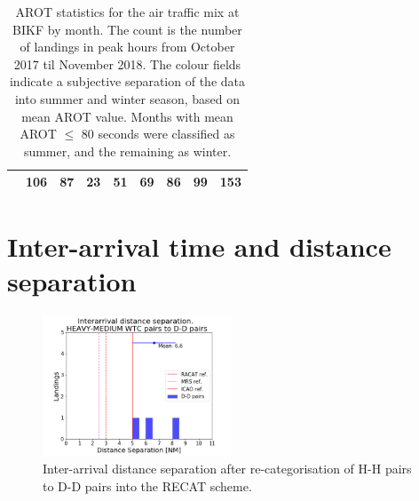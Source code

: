\begin{table}[h]
{\begin{tabular}{lr|r|r|r|r|r|r|r|}
\rowcolor[HTML]{DAE8FC} 
\multicolumn{1}{|l|}{\cellcolor[HTML]{DAE8FC}December} & 106 & 87 & 23 & 51 & 69 & 86 & 99 & 153 \\ \hline
\end{tabular}%
}
\caption[AROTs for the air traffic mix by month]{AROT statistics for the air traffic mix at BIKF by month. The count is the number of landings in peak hours from October 2017 til November 2018. The colour fields indicate a subjective separation of the data into summer and winter season, based on mean AROT value. Months with mean AROT $\leq$ 80 seconds were classified as summer, and the remaining as winter.}
\label{tab:month2season_arot}
\end{table}

\clearpage
\chapter{Inter-arrival time and distance separation}

\begin{figure}[h]
    \centering
    \includegraphics[width=0.5\textwidth]{graphics/fig_HM_to_DD_pairs_dist_separ.png}
    \caption[Inter-arrival distance separation of H-M pairs to D-D pairs into the RECAT scheme]{Inter-arrival distance separation after re-categorisation of H-H pairs to D-D pairs into the RECAT scheme.}
    \label{fig:HM_to_DD_pairs_dist_separ}
\end{figure}


